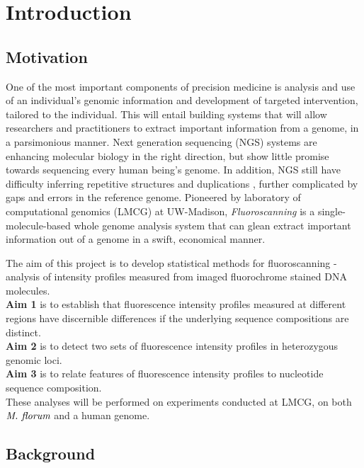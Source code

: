 \section{Introduction}

\subsection{Motivation}
One of the most important components of precision medicine is analysis and use of an individual's genomic information and development of targeted intervention, tailored to the individual. This will entail building systems that will allow researchers and practitioners to extract important information from a genome, in a parsimonious manner. Next generation sequencing (NGS) systems are enhancing molecular biology in the right direction, but show little promise towards sequencing every human being's genome. In addition, NGS still have difficulty inferring repetitive structures and duplications \cite{Lander_etal_2001_Nature}, further complicated by gaps and errors in the reference genome. Pioneered by laboratory of computational genomics (LMCG) at UW-Madison, {\emph{Fluoroscanning}} is a single-molecule-based whole genome analysis system that can glean extract important information out of a genome in a swift, economical manner. 

The aim of this project is to develop statistical methods for fluoroscanning - analysis of intensity profiles measured from imaged fluorochrome stained DNA molecules. \\
{\bf{Aim 1}} is to establish that fluorescence intensity profiles measured at different regions have discernible differences if the underlying sequence compositions are distinct. \\
{\bf{Aim 2}} is to detect two sets of fluorescence intensity profiles in heterozygous genomic loci. \\
{\bf{Aim 3}} is to relate features of fluorescence intensity profiles to nucleotide sequence composition. \\
These analyses will be performed on experiments conducted at LMCG, on both ${\emph{M. florum}}$ and a human genome. 

\subsection{Background}
